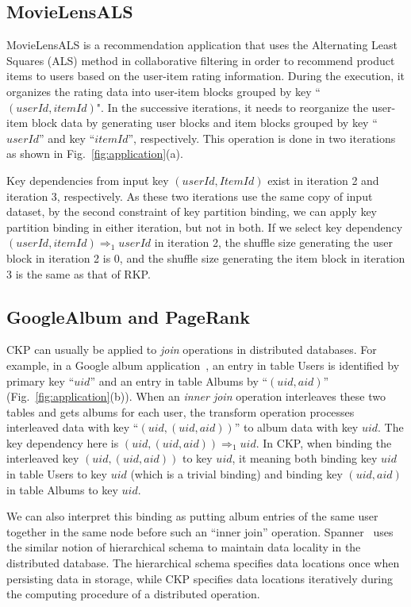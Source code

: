 \documentclass[10pt,journal,compsoc]{IEEEtran}
\begin{document}
\subsection{MovieLensALS}
MovieLensALS \cite{movielensals} is a
recommendation application that uses the Alternating Least Squares (ALS)
method in collaborative filtering in order to recommend product
items to users based on the user-item rating information.
During the execution, it organizes the rating data into user-item
blocks grouped by key ``$(userId, itemId)$".
In the successive iterations, it needs to reorganize the user-item block
data by generating user blocks and item blocks grouped by
key ``$userId$'' and key ``$itemId$'', respectively.
This operation is done in two iterations as shown in Fig.~\ref{fig:application}(a). 

Key dependencies from input key $(userId, ItemId)$ exist in
iteration 2 and iteration 3, respectively.
As these two iterations use the same copy of input dataset, 
by the second constraint of key partition binding, 
we can apply key partition binding in either iteration, 
but not in both.
If we select key dependency $(userId, itemId) \Rightarrow_1
userId$ in iteration 2, the shuffle size generating the user block 
in iteration 2 is $0$, 
and the shuffle size generating the item block in iteration 3 
is the same as that of RKP.


\subsection{GoogleAlbum and PageRank}
CKP can usually be applied to \emph{join} operations in distributed databases.
For example, in a Google album application~\cite{google2012spanner}, 
an entry in table Users is identified by primary key ``$uid$''
and an entry in table Albums by ``$(uid, aid)$'' (Fig.~\ref{fig:application}(b)). 
When an \emph{inner join} operation interleaves these two tables and gets albums for 
each user, the transform operation processes interleaved data 
with key ``$(uid, (uid, aid))$'' to album data with key $uid$. 
The key dependency here is $(uid, (uid, aid)) \Rightarrow_{1} uid$.
In CKP, when binding the interleaved key $(uid, (uid, aid))$ to key $uid$, 
it meaning both binding key $uid$ in table Users to key $uid$ (which is a trivial binding)
and binding key $(uid, aid)$ in table Albums to key $uid$. 

We can also interpret this binding as putting album entries 
of the same user together
in the same node before such an ``inner join'' operation.
Spanner~\cite{google2012spanner} uses the similar notion of 
hierarchical schema to maintain data locality in the distributed database. 
The hierarchical schema specifies data locations once when persisting data in storage, 
while CKP specifies data locations iteratively during the computing procedure of a distributed operation.
\end{document}
